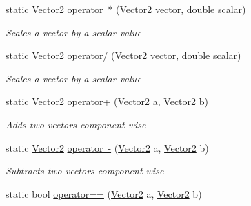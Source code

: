 \begin{DoxyCompactItemize}
\item 
static \mbox{\hyperlink{struct_eagle_eye_1_1_models_1_1_geometry_1_1_vector2}{Vector2}} \mbox{\hyperlink{struct_eagle_eye_1_1_models_1_1_geometry_1_1_vector2_a22a207e259bc6984ae867a3911a93f46}{operator $\ast$}} (\mbox{\hyperlink{struct_eagle_eye_1_1_models_1_1_geometry_1_1_vector2}{Vector2}} vector, double scalar)
\begin{DoxyCompactList}\small\item\em Scales a vector by a scalar value \end{DoxyCompactList}\item 
static \mbox{\hyperlink{struct_eagle_eye_1_1_models_1_1_geometry_1_1_vector2}{Vector2}} \mbox{\hyperlink{struct_eagle_eye_1_1_models_1_1_geometry_1_1_vector2_a4306acd1970edab7db3d8654d2eb5c9d}{operator/}} (\mbox{\hyperlink{struct_eagle_eye_1_1_models_1_1_geometry_1_1_vector2}{Vector2}} vector, double scalar)
\begin{DoxyCompactList}\small\item\em Scales a vector by a scalar value \end{DoxyCompactList}\item 
static \mbox{\hyperlink{struct_eagle_eye_1_1_models_1_1_geometry_1_1_vector2}{Vector2}} \mbox{\hyperlink{struct_eagle_eye_1_1_models_1_1_geometry_1_1_vector2_a2fee5bfd7f9b9f9cafe352390bef52a3}{operator+}} (\mbox{\hyperlink{struct_eagle_eye_1_1_models_1_1_geometry_1_1_vector2}{Vector2}} a, \mbox{\hyperlink{struct_eagle_eye_1_1_models_1_1_geometry_1_1_vector2}{Vector2}} b)
\begin{DoxyCompactList}\small\item\em Adds two vectors component-\/wise \end{DoxyCompactList}\item 
static \mbox{\hyperlink{struct_eagle_eye_1_1_models_1_1_geometry_1_1_vector2}{Vector2}} \mbox{\hyperlink{struct_eagle_eye_1_1_models_1_1_geometry_1_1_vector2_a349448334f4d2eb0c85774289baf399d}{operator -\/}} (\mbox{\hyperlink{struct_eagle_eye_1_1_models_1_1_geometry_1_1_vector2}{Vector2}} a, \mbox{\hyperlink{struct_eagle_eye_1_1_models_1_1_geometry_1_1_vector2}{Vector2}} b)
\begin{DoxyCompactList}\small\item\em Subtracts two vectors component-\/wise \end{DoxyCompactList}\item 
static bool \mbox{\hyperlink{struct_eagle_eye_1_1_models_1_1_geometry_1_1_vector2_af4c7aab632ee36849bc5ad2731cb2b86}{operator==}} (\mbox{\hyperlink{struct_eagle_eye_1_1_models_1_1_geometry_1_1_vector2}{Vector2}} a, \mbox{\hyperlink{struct_eagle_eye_1_1_models_1_1_geometry_1_1_vector2}{Vector2}} b)

\end{DoxyCompactItemize}
